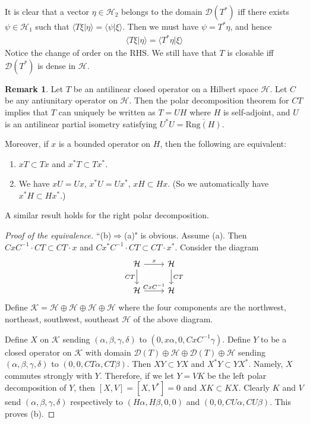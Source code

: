 \documentclass[12pt,b5paper,notitlepage]{article}
\theoremstyle{definition}
\newtheorem{rem}[df]{Remark}
\theoremstyle{plain}
\newcommand{\mc}{\mathcal}
\newcommand{\ovl}{\overline}
\newcommand{\Dom}{\scr{D}}
\newcommand{\bk}[1]{\langle {#1}\rangle}
\newcommand{\scr}{\mathscr}
\newcommand{\Rng}{\mathrm{Rng}}
\numberwithin{equation}{section}
\begin{document}
It is clear that a vector $\eta\in\mc H_2$ belongs to the domain $\Dom(T^*)$ iff there exists $\psi\in\mc H_1$ such that $\bk{T\xi|\eta}=\bk{\psi|\xi}$. Then we must have $\psi=T^*\eta$, and hence
\begin{align}
\bk{T\xi|\eta}=\bk{T^*\eta|\xi}
\end{align}
Notice the change of order on the RHS. We still have that $T$ is closable iff $\Dom(T^*)$ is dense in $\mc H$.  \hfill\qedsymbol


\begin{rem}\label{lba20}
Let $T$ be an antilinear closed operator on a Hilbert space $\mc H$. Let $C$ be any antiunitary operator on $\mc H$. Then the polar decomposition theorem for $CT$ implies that $T$ can uniquely be written as $T=UH$ where $H$ is self-adjoint, and $U$ is an antilinear partial isometry satisfying $U^*U=\ovl{\Rng(H)}$. 

Moreover, if $x$ is a bounded operator on $H$, then the following are equivalent:
\begin{enumerate}[label=(\alph*)]
\item $xT\subset Tx$ and $x^*T\subset Tx^*$.
\item We have $xU=Ux$, $x^*U=Ux^*$, $xH\subset Hx$. (So we automatically have $x^*H\subset Hx^*$.)
\end{enumerate}
\end{rem}

A similar result holds for the right polar decomposition.

\begin{proof}[Proof of the equivalence]
``(b)$\Rightarrow$(a)" is obvious. Assume (a). Then $CxC^{-1}\cdot CT\subset CT\cdot x$ and $Cx^*C^{-1}\cdot CT\subset CT\cdot x^*$. Consider the diagram
\begin{equation*}
\begin{tikzcd}
\mc H \arrow[d, "CT"'] \arrow[r, "x"] & \mc H \arrow[d, "CT"] \\
\mc H \arrow[r, "CxC^{-1}"]           & \mc H                
\end{tikzcd}
\end{equation*}
Define $\mc K=\mc H\oplus\mc H\oplus\mc H\oplus\mc H$ where the four components are the northwest, northeast, southwest, southeast $\mc H$ of the above diagram.

Define $X$ on $\mc K$ sending $(\alpha,\beta,\gamma,\delta)$ to $(0,x\alpha,0,CxC^{-1}\gamma)$. Define $Y$ to be a closed operator on $\mc K$ with domain $\Dom(T)\oplus\mc H\oplus\Dom(T)\oplus\mc H$ sending  $(\alpha,\beta,\gamma,\delta)$ to $(0,0,CT\alpha,CT\beta)$. Then $XY\subset YX$ and $X^*Y\subset YX^*$. Namely, $X$ commutes strongly with $Y$. Therefore, if we let $Y=VK$ be the left polar decomposition of $Y$, then $[X,V]=[X,V^*]=0$ and $XK\subset KX$. Clearly $K$ and $V$ send $(\alpha,\beta,\gamma,\delta)$ respectively to $(H\alpha,H\beta,0,0)$ and $(0,0,CU\alpha,CU\beta)$. This proves (b).
\end{proof}
\end{document}

